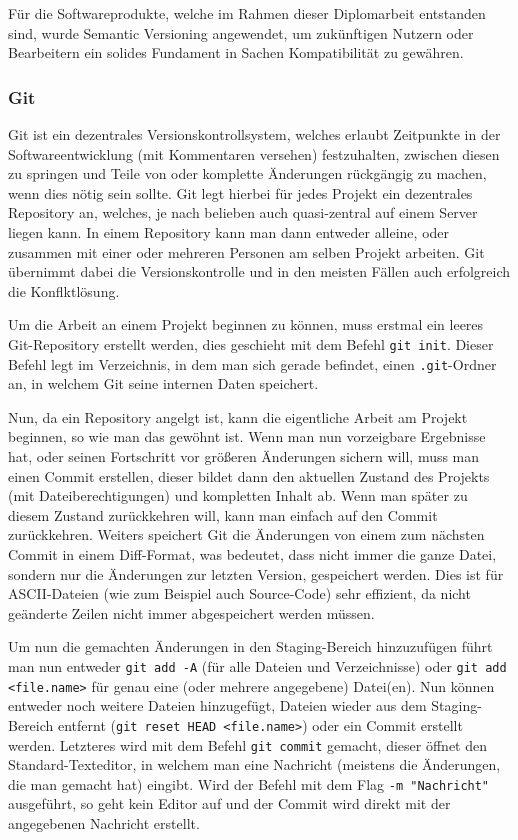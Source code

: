Für die Softwareprodukte, welche im Rahmen dieser Diplomarbeit entstanden sind, wurde Semantic Versioning angewendet, um zukünftigen Nutzern oder Bearbeitern ein solides Fundament in Sachen Kompatibilität zu gewähren.

\subsubsection{Git}
Git ist ein dezentrales Versionskontrollsystem, welches erlaubt Zeitpunkte in der Softwareentwicklung (mit Kommentaren versehen) festzuhalten, zwischen diesen zu springen und Teile von oder komplette Änderungen rückgängig zu machen, wenn dies nötig sein sollte. Git legt hierbei für jedes Projekt ein dezentrales Repository an, welches, je nach belieben auch quasi-zentral auf einem Server liegen kann. In einem Repository kann man dann entweder alleine, oder zusammen mit einer oder mehreren Personen am selben Projekt arbeiten. Git übernimmt dabei die Versionskontrolle und in den meisten Fällen auch erfolgreich die Konflktlösung.

Um die Arbeit an einem Projekt beginnen zu können, muss erstmal ein leeres Git-Repository erstellt werden, dies geschieht mit dem Befehl \texttt{git init}. Dieser Befehl legt im Verzeichnis, in dem man sich gerade befindet, einen \texttt{.git}-Ordner an, in welchem Git seine internen Daten speichert.

Nun, da ein Repository angelgt ist, kann die eigentliche Arbeit am Projekt beginnen, so wie man das gewöhnt ist. Wenn man nun vorzeigbare Ergebnisse hat, oder seinen Fortschritt vor größeren Änderungen sichern will, muss man einen Commit erstellen, dieser bildet dann den aktuellen Zustand des Projekts (mit Dateiberechtigungen) und kompletten Inhalt ab. Wenn man später zu diesem Zustand zurückkehren will, kann man einfach auf den Commit zurückkehren. Weiters speichert Git die Änderungen von einem zum nächsten Commit in einem Diff-Format, was bedeutet, dass nicht immer die ganze Datei, sondern nur die Änderungen zur letzten Version, gespeichert werden. Dies ist für ASCII-Dateien (wie zum Beispiel auch Source-Code) sehr effizient, da nicht geänderte Zeilen nicht immer abgespeichert werden müssen.

Um nun die gemachten Änderungen in den Staging-Bereich hinzuzufügen führt man nun entweder \texttt{git add -A} (für alle Dateien und Verzeichnisse) oder \texttt{git add <file.name>} für genau eine (oder mehrere angegebene) Datei(en). Nun können entweder noch weitere Dateien hinzugefügt, Dateien wieder aus dem Staging-Bereich entfernt (\texttt{git reset HEAD <file.name>}) oder ein Commit erstellt werden. Letzteres wird mit dem Befehl \texttt{git commit} gemacht, dieser öffnet den Standard-Texteditor, in welchem man eine Nachricht (meistens die Änderungen, die man gemacht hat) eingibt. Wird der Befehl mit dem Flag \texttt{-m "Nachricht"} ausgeführt, so geht kein Editor auf und der Commit wird direkt mit der angegebenen Nachricht erstellt.

